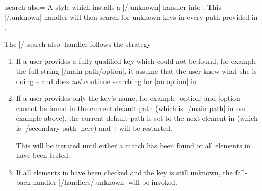 \begin{handler}{{.search also}=}
  A style which installs a |/.unknown| handler into . This
  |/.unknown| handler will then search for unknown keys in every path
  provided in .

\begin{codeexample}[]


\end{codeexample}

  The |/.search also| handler follows the strategy
  \begin{enumerate}
  \item If a user provides a fully qualified key which could not be
    found, for example the full string |/main path/option|, it assume
    that the user knew what she is doing -- and does \emph{not} continue
    searching for |an option| in .
  \item If a user provides only the key's name, for example |option|
    and |option| cannot be found in the current default path (which is
    |/main path| in our example above), the current default path is
    set to the next element in  (which is
    |/secondary path| here) and |\pgfkeys| will be restarted.

    This will be iterated until either a match has been found or all
    elements in  have been tested.
  \item If all elements in  have been checked and the
    key is still unknown, the fall-back handler |/handlers/.unknown|
    will be invoked.
  \end{enumerate}
\begin{codeexample}[]



%
\end{codeexample}


\end{handler}
